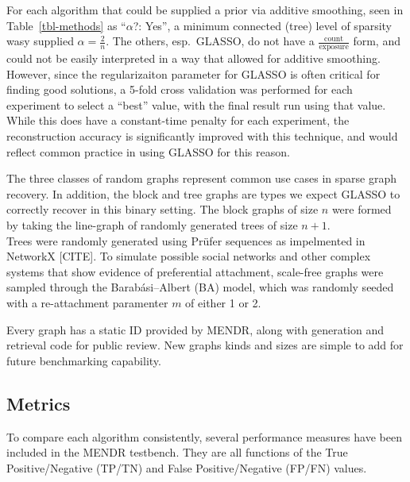 \documentclass[%
	12pt,
		oneside,
		letterpaper
]{book}
\begin{document}
For each algorithm that could be supplied a prior via additive
smoothing, seen in Table~\ref{tbl-methods} as ``\(\alpha\)?: Yes'', a
minimum connected (tree) level of sparsity wasy supplied
\(\alpha=\tfrac{2}{n}\). The others, esp.~GLASSO, do not have a
\(\tfrac{\text{count}}{\text{exposure}}\) form, and could not be easily
interpreted in a way that allowed for additive smoothing. However, since
the regularizaiton parameter for GLASSO is often critical for finding
good solutions, a 5-fold cross validation was performed for each
experiment to select a ``best'' value, with the final result run using
that value. While this does have a constant-time penalty for each
experiment, the reconstruction accuracy is significantly improved with
this technique, and would reflect common practice in using GLASSO for
this reason.

The three classes of random graphs represent common use cases in sparse
graph recovery. In addition, the block and tree graphs are types we
expect GLASSO to correctly recover in this binary
setting.\autocite{Structureestimationdiscrete_Loh2012} The block graphs
of size \(n\) were formed by taking the line-graph of randomly generated
trees of size \(n+1\).\\
Trees were randomly generated using Prüfer sequences as impelmented in
NetworkX {[}CITE{]}. To simulate possible social networks and other
complex systems that show evidence of preferential attachment,
scale-free graphs were sampled through the Barabási--Albert (BA) model,
which was randomly seeded with a re-attachment paramenter \(m\) of
either 1 or 2.

Every graph has a static ID provided by MENDR, along with generation and
retrieval code for public review. New graphs kinds and sizes are simple
to add for future benchmarking capability.

\subsection{Metrics}\label{metrics}

To compare each algorithm consistently, several performance measures
have been included in the MENDR testbench. They are all functions of the
True Positive/Negative (TP/TN) and False Positive/Negative (FP/FN)
values.
\end{document}
